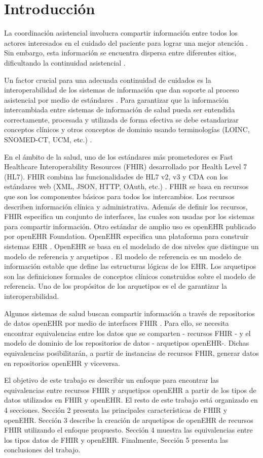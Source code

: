 \section{Introducción}

La coordinación asistencial involucra compartir información entre todos los actores interesados en el cuidado del paciente para lograr una mejor atención \cite{CareCoordination}. Sin embargo, esta información se encuentra dispersa entre diferentes sitios, dificultando la continuidad asistencial \cite{Indarte11}.

Un factor crucial para una adecuada continuidad de cuidados es la interoperabilidad de los sistemas de información que dan soporte al proceso asistencial por medio de estándares \cite{OPS16}. Para garantizar que la información intercambiada entre sistemas de información de salud pueda ser entendida correctamente, procesada y utilizada de forma efectiva se debe estandarizar conceptos clínicos y otros conceptos de dominio usando terminologías (LOINC, SNOMED-CT, UCM, etc.) \cite{ISO20514}.

En el ámbito de la salud, uno de los estándares más prometedores es Fast Healthcare Interoperability Resources (FHIR) desarrollado por Health Level 7 (HL7). FHIR combina las funcionalidades de HL7 v2, v3 y CDA con los estándares web (XML, JSON, HTTP, OAuth, etc.) \cite{FHIR}. FHIR se basa en recursos que son los componentes básicos para todos los intercambios. Los recursos describen información clínica y administrativa. Además de definir los recursos, FHIR especifica un conjunto de interfaces, las cuales son usadas por los sistemas para compartir información. Otro estándar de amplio uso es openEHR publicado por openEHR Foundation. OpenEHR especifica una plataforma para construir sistemas EHR \cite{openEHR}. OpenEHR se basa en el modelado de dos niveles que distingue un modelo de referencia y arquetipos \cite{Bale00}. El modelo de referencia es un modelo de información estable que define las estructuras lógicas de los EHR. Los arquetipos son las definiciones formales de conceptos clínicos construidos sobre el modelo de referencia. Uno de los propósitos de los arquetipos es el de garantizar la interoperabilidad.

Algunos sistemas de salud buscan compartir información a través de repositorios de datos openEHR por medio de interfaces FHIR \cite{Lopez16}. Para ello, se necesita encontrar equivalencias entre los datos que se comparten - recursos FHIR - y el modelo de dominio de los repositorios de datos - arquetipos openEHR-. Dichas equivalencias posibilitarán, a partir de instancias de recursos FHIR, generar datos en repositorios openEHR y viceversa.

El objetivo de este trabajo es describir un enfoque para encontrar las equivalencias entre recursos FHIR y arquetipos openEHR a partir de los tipos de datos utilizados en FHIR y openEHR. El resto de este trabajo está organizado en 4 secciones. Sección 2 presenta las principales características de FHIR y openEHR. Sección 3 describe la creación de arquetipos de openEHR de recursos FHIR utilizando el enfoque propuesto. Sección 4 muestra las equivalencias entre los tipos datos de FHIR y openEHR. Finalmente, Sección 5 presenta las conclusiones del trabajo.
